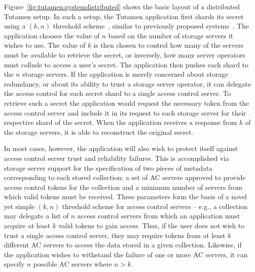 Figure~\ref{fig:tutamen:systemdistributed} shows the basic layout of a
distributed Tutamen setup. In such a setup, the Tutamen application
first shards its secret using a $(k, n)$ threshold
scheme~\cite{krawczyk1993, shamir1979}, similar to previously proposed
systems~\cite{bessani2011, blaze1996, denning1996}. The application
chooses the value of $n$ based on the number of storage servers it
wishes to use. The value of $k$ is then chosen to control how many of
the servers must be available to retrieve the secret, or inversely,
how many server operators must collude to access a user's secret. The
application then pushes each shard to the $n$ storage servers. If the
application is merely concerned about storage redundancy, or about its
ability to trust a storage server operator, it can delegate the access
control for each secret shard to a single access control server. To
retrieve such a secret the application would request the necessary
token from the access control server and include it in its request to
each storage server for their respective shard of the secret. When the
application receives a response from $k$ of the storage servers, it is
able to reconstruct the original secret.

In most cases, however, the application will also wish to protect
itself against access control server trust and reliability
failures. This is accomplished via storage server support for the
specification of two pieces of metadata corresponding to each stored
collection: a set of AC servers approved to provide access control
tokens for the collection and a minimum number of servers from which
valid tokens must be received. These parameters form the basis of a
novel yet simple $(k, n)$ threshold scheme for access control servers
-- e.g., a collection may delegate a list of $n$ access control
servers from which an application must acquire at least $k$ valid
tokens to gain access. Thus, if the user does not wish to trust a
single access control server, they may require tokens from at least
$k$ different AC servers to access the data stored in a given
collection. Likewise, if the application wishes to withstand the
failure of one or more AC servers, it can specify $n$ possible AC
servers where $n > k$.

